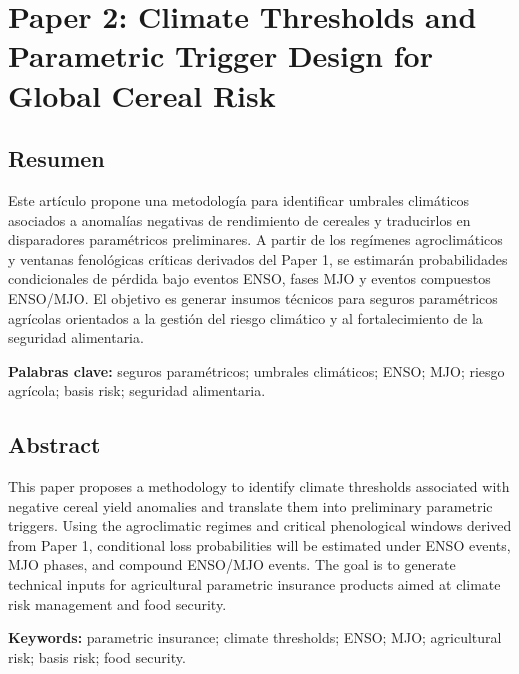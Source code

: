 \chapter{Paper 2: Climate Thresholds and Parametric Trigger Design for Global Cereal Risk}


\section*{Resumen}

Este artículo propone una metodología para identificar umbrales climáticos asociados a anomalías negativas de rendimiento de cereales y traducirlos en disparadores paramétricos preliminares. A partir de los regímenes agroclimáticos y ventanas fenológicas críticas derivados del Paper 1, se estimarán probabilidades condicionales de pérdida bajo eventos ENSO, fases MJO y eventos compuestos ENSO/MJO. El objetivo es generar insumos técnicos para seguros paramétricos agrícolas orientados a la gestión del riesgo climático y al fortalecimiento de la seguridad alimentaria.


\textbf{Palabras clave:} seguros paramétricos; umbrales climáticos; ENSO; MJO; riesgo agrícola; basis risk; seguridad alimentaria.

\section*{Abstract}

This paper proposes a methodology to identify climate thresholds associated with negative cereal yield anomalies and translate them into preliminary parametric triggers. Using the agroclimatic regimes and critical phenological windows derived from Paper 1, conditional loss probabilities will be estimated under ENSO events, MJO phases, and compound ENSO/MJO events. The goal is to generate technical inputs for agricultural parametric insurance products aimed at climate risk management and food security.


\textbf{Keywords:} parametric insurance; climate thresholds; ENSO; MJO; agricultural risk; basis risk; food security.

